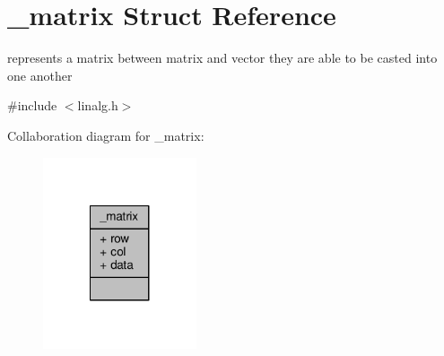\hypertarget{struct__matrix}{\section{\-\_\-matrix Struct Reference}
\label{struct__matrix}
}


represents a matrix between matrix and vector they are able to be casted into one another  




{\ttfamily \#include $<$linalg.\-h$>$}



Collaboration diagram for \-\_\-matrix\-:
\nopagebreak
\begin{figure}[H]
\begin{center}
\leavevmode
\includegraphics[width=128pt]{struct__matrix__coll__graph}
\end{center}
\end{figure}
